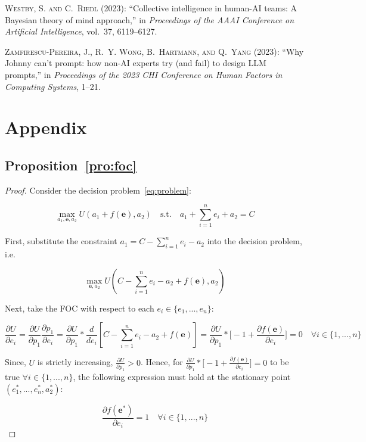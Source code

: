 \documentclass[11pt]{article}
\theoremstyle{definition}
\theoremstyle{remark}
\begin{document}
\begin{thebibliography}{70}
\textsc{Westby, S. and C.~Riedl} (2023): \enquote{Collective intelligence in human-AI teams: A Bayesian theory of mind approach,} in \emph{Proceedings of the AAAI Conference on Artificial Intelligence}, vol.~37, 6119--6127.

\textsc{Zamfirescu-Pereira, J., R.~Y. Wong, B.~Hartmann, and Q.~Yang} (2023): \enquote{Why Johnny can’t prompt: how non-AI experts try (and fail) to design LLM prompts,} in \emph{Proceedings of the 2023 CHI Conference on Human Factors in Computing Systems}, 1--21.

\end{thebibliography}

\newpage
\appendix
\section{Appendix}
\subsection{Proposition~\ref{pro:foc}}
\label{app:foc}
\begin{proof}
Consider the decision problem~\ref{eq:problem}:

$$\max_{a_1,\mathbf{e},a_2} U(a_1+f(\mathbf{e}),a_2)
\quad \text{s.t.} \quad a_1 + \sum_{i=1}^n e_i + a_2 = C$$

First, substitute the constraint $a_1=C-\sum_{i=1}^n e_i-a_2$ into the decision problem, i.e.

$$\max_{\mathbf{e},a_2} U(C-\sum_{i=1}^n e_i-a_2+f(\mathbf{e}),a_2)$$

Next, take the FOC with respect to each $e_i\in\{e_1,...,e_n\}$:

$$\frac{\partial U}{\partial e_i}=\frac{\partial U}{\partial p_1}\frac{\partial p_1}{\partial e_i}=\frac{\partial U}{\partial p_1}*\frac{d}{de_i}[C-\sum_{i=1}^n e_i-a_2+f(\mathbf{e})]=\frac{\partial U}{\partial p_1}*\bigg[-1+\frac{\partial f(\mathbf{e})}{\partial e_i}\bigg]=0\quad\forall i\in\{1,...,n\}$$

Since, $U$ is strictly increasing, $\frac{\partial U}{\partial p_1}>0$. Hence, for $\frac{\partial U}{\partial p_1}*\bigg[-1+\frac{\partial f(\mathbf{e})}{\partial e_i}\bigg]=0$ to be true $\forall i\in\{1,...,n\}$, the following expression must hold at the stationary point $(e^*_1,...,e^*_n,a^*_2)$:

$$\frac{\partial f(\mathbf{e^*})}{\partial e_i}=1\quad\forall i\in\{1,...,n\}$$

\end{proof}
\end{document}
